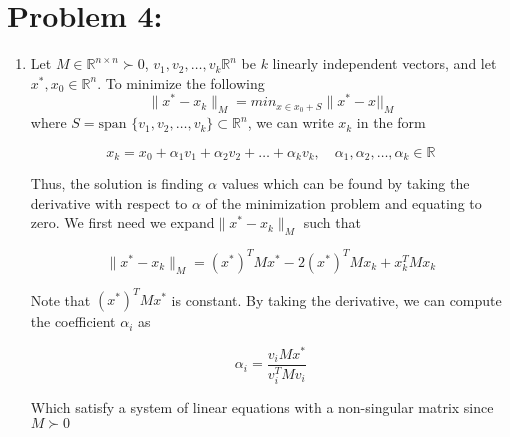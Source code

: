 \newpage
\section*{Problem 4:}
\begin{enumerate}
\item Let $M\in \mathbb{R}^{n\times n}\succ 0$, $v_{1}, v_{2}, \dots, v_{k}\mathbb{R}^{n}$ be $k$ linearly independent vectors, and let $x^{*}, x_{0} \in \mathbb{R}^{n}$. To minimize the following 
$$\parallel x^{*} - x_{k} \parallel_{M} = min_{x\in x_{0}+S} \parallel x^{*} -x||_{M}$$
where $S = \text{span }\{v_{1}, v_{2}, \dots, v_{k}\}\subset \mathbb{R}^{n}$, we can write $x_{k}$ in the form 

$$
x_{k} = x_{0} + \alpha_{1}v_{1} + \alpha_{2}v_{2} + \dots + \alpha_{k}v_{k}, \quad \alpha_{1},\alpha_{2}, \dots, \alpha_{k} \in \mathbb{R}
$$
%

Thus, the solution is finding $\alpha$ values which can be found by taking the derivative with respect to $\alpha$ of the minimization problem and equating to zero. We first need we expand$ \parallel x^{*} - x_{k} \parallel_{M} $ such that 

$$
\parallel x^{*} - x_{k} \parallel_{M}  = (x^{*})^{T} Mx^{*} - 2(x^{*})^{T}Mx_{k} + x_{k}^{T}Mx_{k}
$$

Note that $(x^{*})^{T} Mx^{*}$ is constant. By taking the derivative, we can compute the coefficient $\alpha_{i}$ as 

$$\alpha_{i} = \frac{v_{i}Mx^{*}}{v_{i}^{T}Mv_{i}}$$

Which satisfy a system of linear equations with a non-singular  matrix since  $M\succ0$






\end{enumerate}